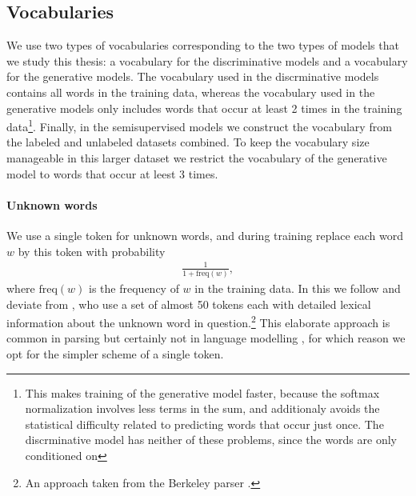 \subsection{Vocabularies}
We use two types of vocabularies corresponding to the two types of models that we study this thesis: a vocabulary for the discriminative models and a vocabulary for the generative models. The vocabulary used in the discrminative models contains all words in the training data, whereas the vocabulary used in the generative models only includes words that occur at least 2 times in the training data\footnote{This makes training of the generative model faster, because the softmax normalization involves less terms in the sum, and additionaly avoids the statistical difficulty related to predicting words that occur just once. The discrminative model has neither of these problems, since the words are only conditioned on}. Finally, in the semisupervised models we construct the vocabulary from the labeled and unlabeled datasets combined. To keep the vocabulary size manageable in this larger dataset we restrict the vocabulary of the generative model to words that occur at leest 3 times.

\paragraph{Unknown words} We use a single token for unknown words, and during training replace each word $w$ by this token with probability
\begin{align*}
  \frac{1}{1 + \text{freq}(w)},
\end{align*}
where $\text{freq}(w)$ is the frequency of $w$ in the training data. In this we follow \citet{stern2017minimal} and deviate from \citet{dyer2016rnng}, who use a set of almost 50 tokens each with detailed lexical information about the unknown word in question.\footnote{An approach taken from the Berkeley parser \citep{petrov2006learning}.} This elaborate approach is common in parsing but certainly not in language modelling \citep{dyer2016rnng}, for which reason we opt for the simpler scheme of a single token.

